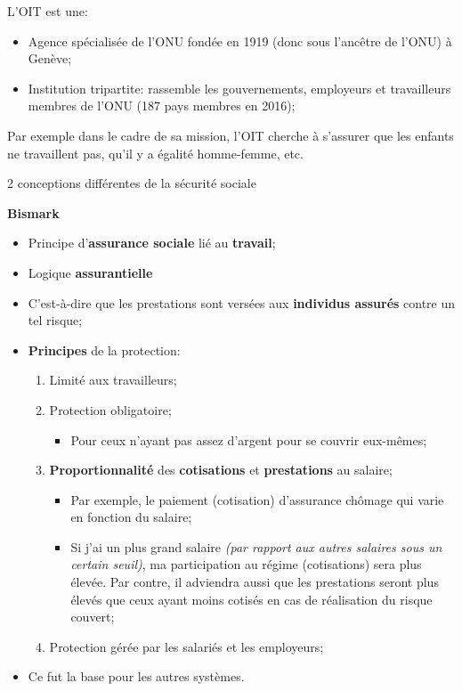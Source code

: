 \documentclass[10pt, french]{article}
\begin{document}
\begin{multicols*}{3}
\begin{definition}
L'OIT est une:
\begin{itemize}
	\item	Agence spécialisée de l'ONU fondée en 1919 (donc sous l'ancêtre de l'ONU) à Genève;
	\item	Institution tripartite: rassemble les gouvernements, employeurs et travailleurs membres de l'ONU (187 pays membres en 2016);
\end{itemize}

Par exemple dans le cadre de sa mission, l'OIT cherche à s'assurer que les enfants ne travaillent pas, qu'il y a égalité homme-femme, etc.
\end{definition}

\begin{conceptgen}{2 conceptions différentes de la sécurité sociale}
\begin{center}
\textbf{Bismark}
\end{center}
\begin{itemize}[leftmargin = *]
	\item	Principe d'\textbf{assurance sociale} lié au \textbf{travail};
	\item	Logique \textbf{assurantielle}
	\item[]	C'est-à-dire que les prestations sont versées aux \textbf{individus assurés} contre un tel risque;
	\item	\textbf{Principes} de la protection:
		\begin{enumerate}
		\item	Limité aux travailleurs;
		\item	Protection obligatoire;
			\begin{itemize}
			\item	Pour ceux n'ayant pas assez d'argent pour se couvrir eux-mêmes;
			\end{itemize}
		\item	\textbf{Proportionnalité} des \textbf{cotisations} et \textbf{prestations} au salaire;
			\begin{itemize}
			\item	Par exemple, le paiement (cotisation) d'assurance chômage qui varie en fonction du salaire;
			\item	Si j'ai un plus grand salaire \textit{(par rapport aux autres salaires sous un certain seuil)}, ma participation au régime (cotisations) sera plus élevée. Par contre, il adviendra aussi que les prestations seront plus élevés que ceux ayant moins cotisés en cas de réalisation du risque couvert;
			\end{itemize}
			\item	Protection gérée par les salariés et les employeurs;
		\end{enumerate}
	\item	Ce fut la base pour les autres systèmes.
\end{itemize}
\tcbline


\end{conceptgen}
\end{multicols*}
\end{document}
